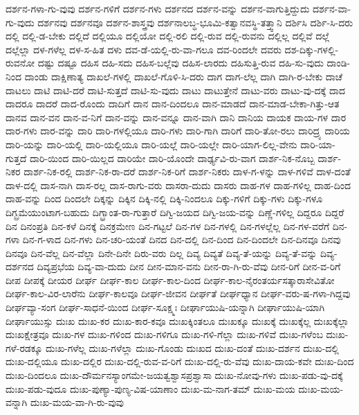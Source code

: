 {ದರ್ಶನ-ಗಳಾ-ಗು-ವುವು
ದರ್ಶನ-ಗಳಿಗೆ
ದರ್ಶನ-ಗಳು
ದರ್ಶನದ
ದರ್ಶನ-ವನ್ನು
ದರ್ಶನ-ವಾಗುತ್ತಿದ್ದುದು
ದರ್ಶನ-ವಾ-ಗು-ವುದು
ದರ್ಶನವು
ದರ್ಶನವೂ
ದರ್ಶನ-ಶಾಸ್ತ್ರವು
ದರ್ಶನಾಲಬ್ಧ-ಭೂಮಿ-ಕತ್ವಾನವಸ್ಥಿ-ತತ್ತ್ವಾನಿ
ದರ್ಶಿಸಿ
ದರ್ಶಿ-ಸಿ-ದರು
ದಲ್ಲಿ
ದಲ್ಲಿ-ಡ-ಬೇಕು
ದಲ್ಲಿದೆ
ದಲ್ಲಿಯೂ
ದಲ್ಲಿಯೋ
ದಲ್ಲಿ-ರಲಿ
ದಲ್ಲಿ-ರುವ
ದಲ್ಲಿ-ರುವನು
ದಲ್ಲಿಲ್ಲ
ದಲ್ಲಿವೆ
ದಲ್ಲೆ
ದಲ್ಲೆಲ್ಲಾ
ದಳ-ಗಳೆಲ್ಲ
ದಳ-ಸ-ಹಿತ
ದಳು
ದವ-ಡೆ-ಯಲ್ಲಿ-ರು-ವಾ-ಗಲೂ
ದವ-ರಿಂದಲೇ
ದವರು
ದಶ-ದಿಕ್ಕು-ಗಳಲ್ಲಿ-ರುವನೋ
ದಷ್ಟು
ದಷ್ಟೂ
ದಹಿಸ
ದಹಿ-ಸದು
ದಹಿಸ-ಬಲ್ಲೆವು
ದಹಿಸ-ಲಾರದು
ದಹಿಸುತ್ತಿ-ರುವ
ದಹಿ-ಸು-ವುದು
ದಾಂಡಿ-ನಿಂದ
ದಾಂಡು
ದಾಕ್ಷಿಣಾತ್ಯ
ದಾಖಲೆ-ಗಳಲ್ಲಿ
ದಾಖಲೆ-ಗೊಳಿ-ಸಿ-ದರು
ದಾಗ
ದಾಗ-ಲೆಲ್ಲ
ದಾಗಿ
ದಾಗಿ-ರ-ಬೇಕು
ದಾಚೆ
ದಾಟಲು
ದಾಟಿ
ದಾಟಿ-ದರೆ
ದಾಟಿ-ಸುತ್ತದೆ
ದಾಟಿ-ಸು-ವುದು
ದಾಟು
ದಾಟುತ್ತೇನೆ
ದಾಟು-ವರು
ದಾಟು-ವು-ದಕ್ಕೆ
ದಾದ
ದಾದರೂ
ದಾದರೆ
ದಾದ-ರೊಂದು
ದಾದಿಗೆ
ದಾನ
ದಾನ-ದಿಂದಲೂ
ದಾನ-ಮಾಡದೆ
ದಾನ-ಮಾಡ-ಬೇಕಾ-ಗಿತ್ತು-ಆತ
ದಾನವ
ದಾನ-ವನ
ದಾನ-ವ-ನಿಗೆ
ದಾನ-ವನ್ನು
ದಾನ-ವನ್ನೂ
ದಾನ-ವಾಗಿ
ದಾನಿ
ದಾನಿಯ
ದಾಯಕ
ದಾಯ-ಗಳ
ದಾರ
ದಾರ-ಗಳು
ದಾರ-ವನ್ನು
ದಾರಿ
ದಾರಿ-ಗಳಲ್ಲಿಯೂ
ದಾರಿ-ಗಳು
ದಾರಿ-ಗಾಗಿ
ದಾರಿಗೆ
ದಾರಿ-ತೋ-ರಲು
ದಾರಿದ್ರ್ಯ
ದಾರಿಯ
ದಾರಿ-ಯನ್ನು
ದಾರಿ-ಯಲ್ಲಿ
ದಾರಿ-ಯಲ್ಲಿಯೂ
ದಾರಿ-ಯಲ್ಲೆ
ದಾರಿ-ಯಲ್ಲೇ
ದಾರಿ-ಯಾಗ-ಲಿಲ್ಲ-ವೇನು
ದಾರಿ-ಯಾ-ಗುತ್ತದೆ
ದಾರಿ-ಯಿಂದ
ದಾರಿ-ಯಿಲ್ಲದ
ದಾರಿಯೇ
ದಾರಿ-ಯೊಂದೇ
ದಾರ್ಢ್ಯವಿ-ರು-ವಾಗ
ದಾರ್ಶ-ನಿಕ-ನೊಬ್ಬ
ದಾರ್ಶ-ನಿಕರ
ದಾರ್ಶ-ನಿಕ-ರಲ್ಲಿ
ದಾರ್ಶ-ನಿಕ-ರಾ-ದರೆ
ದಾರ್ಶ-ನಿಕ-ರಿಗೆ
ದಾರ್ಶ-ನಿಕರು
ದಾಳ-ಗ-ಳನ್ನು
ದಾಳ-ಗಳಿವೆ
ದಾಳ-ದಂತೆ
ದಾಳ-ದಲ್ಲಿ
ದಾಸ-ನಾಗಿ
ದಾಸ-ರಲ್ಲ
ದಾಸ-ರಾಗು-ವರು
ದಾಸರಾ-ದುದು
ದಾಸರು
ದಾಹ-ಗಳ
ದಾಹ-ಗಳಿಲ್ಲ
ದಾಹ-ದಿಂದ
ದಾಹ-ವನ್ನು
ದಿಂದ
ದಿಂದಲೇ
ದಿಕ್ಕನ್ನು
ದಿಕ್ಕಿನ
ದಿಕ್ಕಿ-ನಲ್ಲಿ
ದಿಕ್ಕಿ-ನಿಂದಲೂ
ದಿಕ್ಕು-ಗಳಿಗೆ
ದಿಕ್ಕು-ಗಳು
ದಿಕ್ಕು-ಗಳೂ
ದಿಗ್ಬ್ರಮೆಯುಂಟಾಗ-ಬಹುದು
ದಿಗ್ಭ್ರಾಂತ-ರಾ-ಗುತ್ತಾರೆ
ದಿಗ್ವಿ-ಜಯದ
ದಿಗ್ವಿ-ಜಯ-ವನ್ನು
ದಿಣ್ಣೆ-ಗಳಿಲ್ಲ
ದಿದ್ದರೂ
ದಿದ್ದರೆ
ದಿನ
ದಿನಂಪ್ರತಿ
ದಿನ-ಕಳೆ
ದಿನಕ್ಕೆ
ದಿನಕ್ರಮೇಣ
ದಿನ-ಗಟ್ಟಲೆ
ದಿನ-ಗಳ
ದಿನ-ಗಳಲ್ಲಿ
ದಿನ-ಗಳಲ್ಲೆಲ್ಲ
ದಿನ-ಗಳ-ವರೆಗೆ
ದಿನ-ಗಳಾ
ದಿನ-ಗ-ಳಾದ
ದಿನ-ಗಳು
ದಿನ-ಚರಿ-ಯಂತೆ
ದಿನದ
ದಿನ-ದಲ್ಲಿ
ದಿನ-ದಿಂದ
ದಿನ-ದಿಂದಲೇ
ದಿನ-ದಿನವೂ
ದಿನವು
ದಿನವೂ
ದಿನ-ವೆಲ್ಲ
ದಿನ-ವೆಲ್ಲಾ
ದಿನೇ-ದಿನೇ
ದಿರು-ವರು
ದಿಲ್ಲ
ದಿವ್ಯ
ದಿವ್ಯತೆ
ದಿವ್ಯ-ತೆ-ಯನ್ನು
ದಿವ್ಯ-ತೆ-ವನ್ನು
ದಿವ್ಯ-ದರ್ಶನದ
ದಿವ್ಯಪ್ರಭೆಯ
ದಿವ್ಯ-ವಾ-ದುದು
ದೀನ
ದೀನ-ಮಾನ-ವನು
ದೀನ-ರಾ-ಗಿ-ರು-ವೆವು
ದೀನ-ರಿಗೆ
ದೀನ-ವ-ರಿಗೆ
ದೀಪ
ದೀಪಕ್ಕೆ
ದೀಯರ
ದೀರ್ಘ
ದೀರ್ಘ-ಕಾಲ
ದೀರ್ಘ-ಕಾಲ-ದಿಂದ
ದೀರ್ಘ-ಕಾಲ-ನೈರಂತರ್ಯಸತ್ಕಾರಾಸೇವಿತೋ
ದೀರ್ಘ-ಕಾಲ-ವಿರ-ಲಾರೆನು
ದೀರ್ಘ-ಕಾಲವೂ
ದೀರ್ಘ-ಜೀವನ
ದೀರ್ಘತೆ
ದೀರ್ಘಧ್ಯಾನ
ದೀರ್ಘ-ವರು-ಷ-ಗಳಾ-ಗಿದ್ದವು
ದೀರ್ಘವ್ಯಾ-ಸಂಗ
ದೀರ್ಘ-ಸಾಧನೆ-ಯಿಂದ
ದೀರ್ಘ-ಸೂಕ್ಷ್ಮಃ
ದೀರ್ಘಾಯುಷಿ-ಯನ್ನಾಗಿ
ದೀರ್ಘಾಯುಷಿ-ಯಾಗಿ
ದೀರ್ಘಾಯುಸ್ಸು
ದುಃಖ
ದುಃಖ-ಕರ
ದುಃಖ-ಕಾರ-ಕವೂ
ದುಃಖಕ್ಕಿಂತಲೂ
ದುಃಖಕ್ಕೂ
ದುಃಖಕ್ಕೆ
ದುಃಖಕ್ಕೆಲ್ಲ
ದುಃಖಕ್ಕೆಲ್ಲಾ
ದುಃಖಕ್ಷೇತ್ರವೂ
ದುಃಖ-ಗಳ
ದುಃಖ-ಗಳಿಂದ
ದುಃಖ-ಗಳಿಗೂ
ದುಃಖ-ಗಳಿ-ಗೆಲ್ಲಾ
ದುಃಖ-ಗಳಿವೆ
ದುಃಖ-ಗಳೆಂಬ
ದುಃಖ-ಗಳೆ-ರಡಕ್ಕೂ
ದುಃಖ-ಗಳೆಲ್ಲ
ದುಃಖ-ಗಳೆಲ್ಲಾ
ದುಃಖ-ಗೊಂಡು
ದುಃಖದ
ದುಃಖ-ದಂತೆ
ದುಃಖ-ದರ್ಶನ
ದುಃಖ-ದಲ್ಲಿ
ದುಃಖ-ದಲ್ಲಿಯೂ
ದುಃಖ-ದಲ್ಲಿರ
ದುಃಖ-ದಲ್ಲಿ-ರುವ-ವ-ರಿಗೆ
ದುಃಖ-ದಲ್ಲಿ-ರು-ವೆವು
ದುಃಖ-ದಾಯ-ಕವೇ
ದುಃಖ-ದಿಂದ
ದುಃಖ-ದಿಂದಲೂ
ದುಃಖ-ದೌರ್ಮನಸ್ಯಾಂಗಮೇ-ಜಯತ್ವಶ್ವಾಸಪ್ರಶ್ವಾಸಾ
ದುಃಖ-ನೋವು-ಗಳು
ದುಃಖ-ಪಡು-ವು-ದಕ್ಕೆ
ದುಃಖ-ಪಡು-ವುದೂ
ದುಃಖ-ಪುಣ್ಯಾ-ಪುಣ್ಯ-ವಿಷ-ಯಾಣಾಂ
ದುಃಖ-ಮ-ನಾಗ-ತಮ್
ದುಃಖ-ಮಯ
ದುಃಖ-ಮಯ-ವನ್ನಾಗಿ
ದುಃಖ-ಮಯ-ವಾ-ಗಿ-ರು-ವುವು
}
